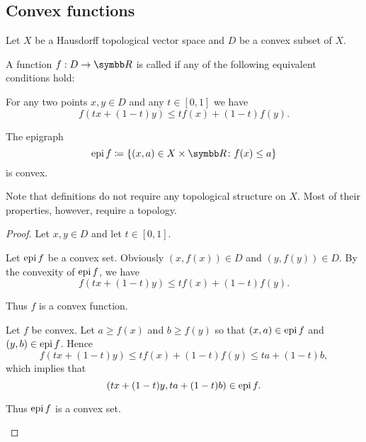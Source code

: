 \subsection{Convex functions}\label{subsec:convex_functions}

Let \( X \) be a Hausdorff topological vector space and \( D \) be a convex subset of \( X \).

\begin{definition}\label{def:convex_functions}
  A function \( f: D \to \R \) is called  if any of the following equivalent conditions hold:

  \begin{defenum}
     For any two points \( x, y \in D \) and any \( t \in [0, 1] \) we have
    \begin{equation*}
      f(tx + (1-t)y) \leq tf(x) + (1-t)f(y).
    \end{equation*}

     The epigraph
    \begin{equation*}
      \Epi f \coloneqq \{ (x, a) \in X \times \R \colon f(x) \leq a \}
    \end{equation*}
    is convex.
  \end{defenum}

  Note that definitions do not require any topological structure on \( X \). Most of their properties, however, require a topology.
\end{definition}
\begin{proof}
  Let \( x, y \in D \) and let \( t \in [0, 1] \).

  \begin{description}
     Let \( \operatorname{epi} f \) be a convex set. Obviously \( (x, f(x)) \in D \) and \( (y, f(y)) \in D \). By the convexity of \( \operatorname{epi} f \), we have
    \begin{equation*}
      f(tx + (1-t)y) \leq tf(x) + (1-t)f(y).
    \end{equation*}

    Thus \( f \) is a convex function.

     Let \( f \) be convex. Let \( a \geq f(x) \) and \( b \geq f(y) \) so that \( (x, a) \in \operatorname{epi} f \) and \( (y, b) \in \operatorname{epi} f \). Hence
    \begin{equation*}
      f(tx + (1-t)y) \leq tf(x) + (1-t)f(y) \leq ta + (1-t)b,
    \end{equation*}
    which implies that
    \begin{equation*}
      (tx + (1-t)y, ta + (1-t)b) \in \operatorname{epi} f.
    \end{equation*}

    Thus \( \operatorname{epi} f \) is a convex set.
  \end{description}
\end{proof}

